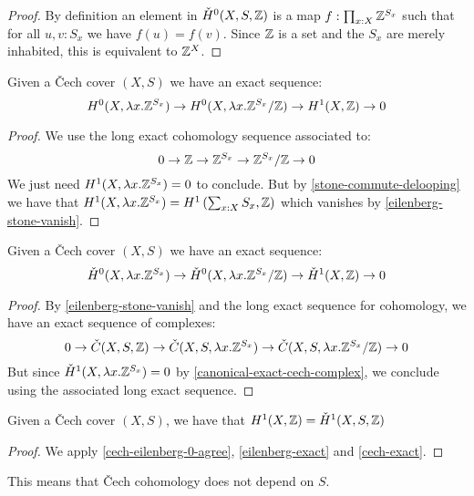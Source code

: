 \begin{proof}
By definition an element in $\check{H}^0(X,S,\mathbb{Z})$ is a map $f:\prod_{x:X}\mathbb{Z}^{S_x}$
such that for all $u,v:S_x$ we have $f(u)=f(v)$. Since $\mathbb{Z}$ is a set and the $S_x$ are merely inhabited, this is equivalent to $\mathbb{Z}^X$.
\end{proof}

\begin{lemma}\label{eilenberg-exact}
Given a \v{C}ech cover $(X,S)$ we have an exact sequence:
\[H^0(X,\lambda x.\mathbb{Z}^{S_x}) \to H^0(X,\lambda x.\mathbb{Z}^{S_x}/\mathbb{Z}) \to H^1(X,\mathbb{Z})\to 0\]
\end{lemma}

\begin{proof}
We use the long exact cohomology sequence associated to:
\[0 \to \mathbb{Z} \to \mathbb{Z}^{S_x} \to \mathbb{Z}^{S_x}/\mathbb{Z}\to 0\]
We just need $H^1(X,\lambda x.\mathbb{Z}^{S_x}) = 0$ to conclude. But by \cref{stone-commute-delooping} we have that $H^1(X,\lambda x.\mathbb{Z}^{S_x}) = H^1\left(\sum_{x:X}S_x,\mathbb{Z}\right)$ which vanishes by \cref{eilenberg-stone-vanish}.
\end{proof}

\begin{lemma}\label{cech-exact}
Given a \v{C}ech cover $(X,S)$ we have an exact sequence:
\[\check{H}^0(X,\lambda x.\mathbb{Z}^{S_x}) \to \check{H}^0(X,\lambda x.\mathbb{Z}^{S_x}/\mathbb{Z}) \to \check{H}^1(X,\mathbb{Z})\to 0\]
\end{lemma}

\begin{proof}
By \cref{eilenberg-stone-vanish} and the long exact sequence for cohomology, we have an exact sequence of complexes:
\[0 \to \check{C}(X,S,\mathbb{Z}) \to \check{C}(X,S,\lambda x.\mathbb{Z}^{S_x}) \to \check{C}(X,S,\lambda x.\mathbb{Z}^{S_x}/\mathbb{Z})\to 0\]
But since $\check{H}^1(X,\lambda x.\mathbb{Z}^{S_x}) = 0$ by \cref{canonical-exact-cech-complex}, we conclude using the associated long exact sequence.
\end{proof}

\begin{theorem}\label{cech-eilenberg-1-agree}
Given a \v{C}ech cover $(X,S)$, we have that $H^1(X,\mathbb{Z}) = \check{H}^1(X,S,\mathbb{Z})$
\end{theorem}

\begin{proof}
We apply \cref{cech-eilenberg-0-agree}, \cref{eilenberg-exact} and \cref{cech-exact}.
\end{proof}

This means that \v{C}ech cohomology does not depend on $S$.

